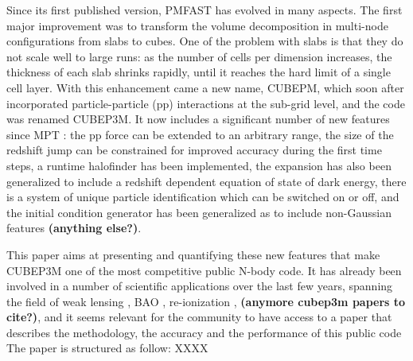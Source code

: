 Since its first published version, {\small PMFAST} has evolved in many aspects. 
The first major improvement was to transform the volume decomposition in multi-node configurations 
from slabs to cubes. One of the problem with slabs is that they do not scale well to large runs: 
as the number of cells per dimension increases, the thickness of each slab shrinks rapidly,
until it reaches the hard limit of a single cell layer.  With this enhancement came a new name, {\small CUBEPM},
which soon after incorporated particle-particle (pp) interactions at the sub-grid level, and the code was renamed
{\small CUBEP3M}. It now includes a significant number of new features since MPT : the pp force
can be extended to an arbitrary range, the size of the redshift jump can be constrained for improved accuracy during the first time steps,
a runtime halofinder has been implemented, the expansion has also been generalized to include a redshift dependent equation of state of dark energy, there is a system of unique particle identification which can be switched on or off, and the initial condition generator has been generalized as to include non-Gaussian features
{\bf (anything else?)}.

This paper aims at presenting and quantifying these new features that make {\small CUBEP3M} one of the most competitive public N-body code.
It has already been involved in a number of scientific applications over the last few years,
spanning the field of weak lensing \citep{Vafaei10, 2008MNRAS.388.1819L,  2009arXiv0905.0501D, 2010PhRvD..81l3015L, 2010arXiv1012.0444Y, Harnois_Vafaei},  BAO
 \citep{2010arXiv1008.3506Z,  2011arXiv1106.5548N, 2011arXiv1109.5746H, HarnoisYuReco}, re-ionization \citep{Ilian...}, {\bf (anymore cubep3m papers to cite?)},  
and it seems relevant for the community to have access to a paper that describes the methodology, the accuracy and the performance of this public code 
The paper is structured as follow: XXXX 



